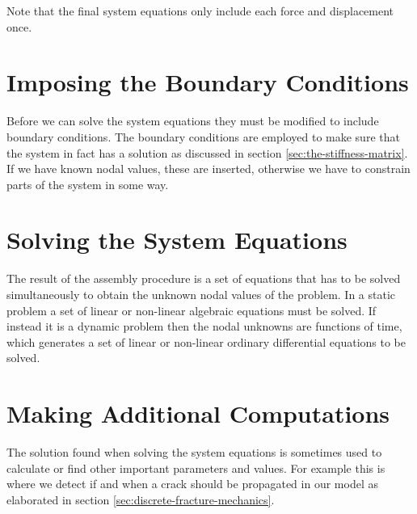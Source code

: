 Note that the final system equations only include each force and
displacement once.

\section{Imposing the Boundary Conditions}
Before we can solve the system equations they must be modified to
include boundary conditions. The boundary conditions are employed to
make sure that the system in fact has a solution as discussed in
section \vref{sec:the-stiffness-matrix}.
If we have known nodal values, these are inserted, otherwise we have
to constrain parts of the system in some way.

\section{Solving the System Equations}
The result of the assembly procedure is a set of equations that has to be
solved simultaneously to obtain the unknown nodal values of the
problem. In a static problem a set of linear or non-linear
algebraic equations must be solved.
If instead it is a dynamic problem then the nodal unknowns
are functions of time, which generates a set of linear or non-linear
ordinary differential equations to be solved.

\section{Making Additional Computations}
The solution found when solving the system equations is
sometimes used to calculate or find other important parameters and
values.
For example this is where we detect if and when a crack should
be propagated in our model as elaborated in section
\vref{sec:discrete-fracture-mechanics}.
